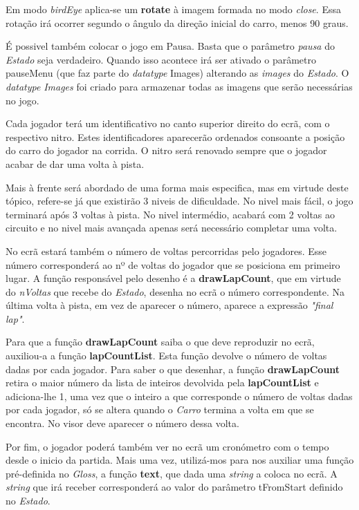 \documentclass[a4paper]{report} %
\begin{document}
Em modo \emph{birdEye} aplica-se um \textbf{rotate} à imagem formada no modo \textit{close}. Essa rotação irá ocorrer segundo o ângulo da direção inicial do carro, menos 90 graus.

É possivel também colocar o jogo em Pausa. Basta que o parâmetro \emph{pausa} do \emph{Estado} seja verdadeiro. Quando isso acontece irá ser ativado o parâmetro pauseMenu (que faz parte do \textit{datatype} Images) alterando as \emph{images} do \emph{Estado}. O \textit{datatype} \emph{Images} foi criado para armazenar todas as imagens que serão necessárias no jogo.

Cada jogador terá um identificativo no canto superior direito do ecrã, com o respectivo nitro. Estes identificadores aparecerão ordenados consoante a posição do carro do jogador na corrida. O nitro será renovado sempre que o jogador acabar de dar uma volta à pista.

Mais à frente será abordado de uma forma mais especifica, mas em virtude deste tópico, refere-se já que existirão 3 niveis de dificuldade.
No nivel mais fácil, o jogo terminará após 3 voltas à pista. No nivel intermédio, acabará com 2 voltas ao circuito e no nivel mais avançada apenas será necessário completar uma volta.

\newpage

No ecrã estará também o número de voltas percorridas pelo jogadores. Esse número corresponderá ao nº de voltas do jogador que se posiciona em primeiro lugar. A função responsável pelo desenho é a \textbf{drawLapCount}, que em virtude do \emph{nVoltas} que recebe do \emph{Estado}, desenha no ecrã o número correspondente. Na última volta à pista, em vez de aparecer o número, aparece a expressão \textit{"final lap"}.

Para que a função \textbf{drawLapCount} saiba o que deve reproduzir no ecrã, auxiliou-a a função \textbf{lapCountList}. Esta função devolve o número de voltas dadas por cada jogador. Para saber o que desenhar, a função \textbf{drawLapCount} retira o maior número da lista de inteiros devolvida pela \textbf{lapCountList} e adiciona-lhe 1, uma vez que o inteiro a que corresponde o número de voltas dadas por cada jogador, só se altera quando o \emph{Carro} termina a volta em que se encontra. No visor deve aparecer o número dessa volta.

Por fim, o jogador poderá também ver no ecrã um cronómetro com o tempo desde o inicio da partida. Mais uma vez, utilizá-mos para nos auxiliar uma função pré-definida no \textit{Gloss}, a função \textbf{text}, que dada uma \emph{string} a coloca no ecrã. A \emph{string} que irá receber corresponderá ao valor do parâmetro tFromStart definido no \emph{Estado}.
\end{document}
